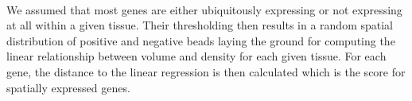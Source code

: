 \documentclass[10pt,a4paper]{article}
\begin{document}
\paragraph{}We assumed that most genes are either ubiquitously expressing or not expressing at all within a given tissue.
Their thresholding then results in a random spatial distribution of positive and negative beads laying the ground for computing the linear relationship between volume and density for each given tissue.
For each gene, the distance to the linear regression is then calculated which is the score for spatially expressed genes.


\end{document}
